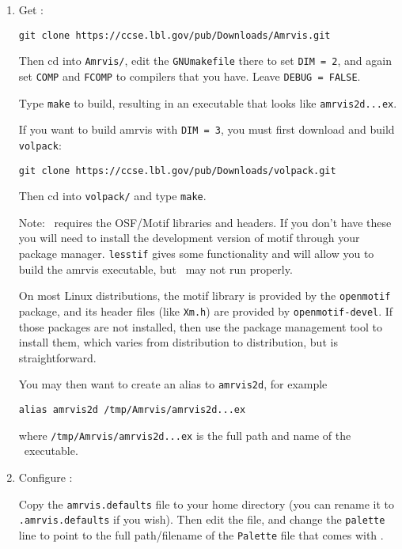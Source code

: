 \begin{enumerate}

\item Get \amrvis:

\begin{verbatim}
git clone https://ccse.lbl.gov/pub/Downloads/Amrvis.git
\end{verbatim}

Then cd into {\tt Amrvis/}, edit the {\tt GNUmakefile} there
to set {\tt DIM = 2}, and again set {\tt COMP} and {\tt FCOMP} to compilers that
you have. Leave {\tt DEBUG = FALSE}.

Type {\tt make} to build, resulting in an executable that
looks like {\tt amrvis2d...ex}.

If you want to build amrvis with {\tt DIM = 3}, you must first
download and build {\tt volpack}:
\begin{verbatim}
git clone https://ccse.lbl.gov/pub/Downloads/volpack.git
\end{verbatim}

Then cd into {\tt volpack/} and type {\tt make}.

Note: \amrvis\ requires the OSF/Motif libraries and headers. If you don't have these 
you will need to install the development version of motif through your package manager. 
{\tt lesstif} gives some functionality and will allow you to build the amrvis executable, 
but \amrvis\ may not run properly.

On most Linux distributions, the motif library is provided by the
{\tt openmotif} package, and its header files (like {\tt Xm.h}) are provided
by {\tt openmotif-devel}. If those packages are not installed, then use the
package management tool to install them, which varies from
distribution to distribution, but is straightforward. 

You may then want to create an alias to {\tt amrvis2d}, for example
\begin{verbatim}
alias amrvis2d /tmp/Amrvis/amrvis2d...ex
\end{verbatim}
where {\tt /tmp/Amrvis/amrvis2d...ex} is the full path and name of the \amrvis\ executable.

\item Configure \amrvis:  

  Copy the {\tt amrvis.defaults} file to your home directory (you can
  rename it to {\tt .amrvis.defaults} if you wish).  Then edit the
  file, and change the {\tt palette} line to point to the full
  path/filename of the {\tt Palette} file that comes with \amrvis.


\end{enumerate}

